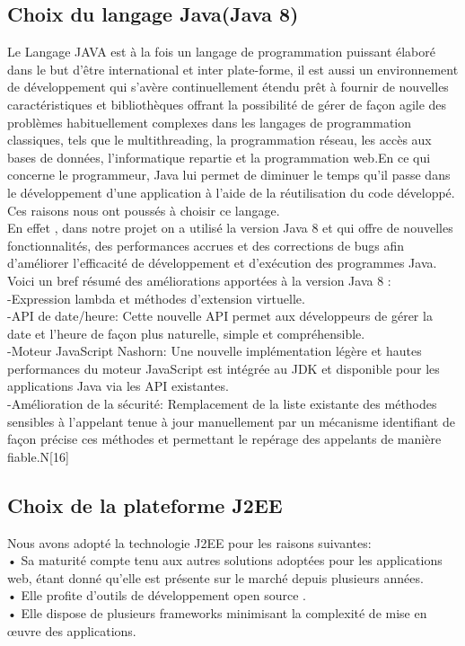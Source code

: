 \documentclass[a4paper,12pt,oneside]{report}
\begin{document}
\subsection{Choix du langage Java(Java 8)}
Le Langage JAVA est à la fois un langage de programmation puissant élaboré dans le but d'être international et inter plate-forme, il est aussi un environnement de développement qui s'avère continuellement étendu prêt à fournir de nouvelles caractéristiques et bibliothèques offrant la possibilité de gérer de façon agile des problèmes habituellement complexes dans les langages de programmation classiques, tels que le multithreading, la programmation réseau, les accès aux bases de données, l'informatique repartie et la programmation web.En ce qui concerne le programmeur, Java lui permet de diminuer le temps qu'il passe dans le développement d'une application  à l'aide de  la réutilisation du code développé. Ces raisons nous ont poussés à choisir ce langage. \\
En effet , dans notre projet on a utilisé la version Java 8 et qui offre de nouvelles fonctionnalités, des performances accrues et des corrections de bugs afin d'améliorer l'efficacité de développement et d'exécution des programmes Java.\\
Voici un bref résumé des améliorations apportées à la version Java 8 : \\
-Expression lambda et méthodes d'extension virtuelle.\\
-API de date/heure:
Cette nouvelle API permet aux développeurs de gérer la date et l'heure de façon plus naturelle, simple et compréhensible.\\
-Moteur JavaScript Nashorn:
Une nouvelle implémentation légère et hautes performances du moteur JavaScript est intégrée au JDK et disponible pour les applications Java via les API existantes.\\
-Amélioration de la sécurité:
Remplacement de la liste existante des méthodes sensibles à l'appelant tenue à jour manuellement par un mécanisme identifiant de façon précise ces méthodes et permettant le repérage des appelants de manière fiable.N[16]
\subsection{Choix de la plateforme J2EE}
Nous avons adopté la technologie J2EE pour les raisons suivantes: \\
• Sa maturité compte tenu aux autres solutions adoptées pour les applications web, étant donné qu'elle est présente sur le marché depuis plusieurs années. \\
• Elle profite d’outils de développement open source .\\
• Elle dispose de plusieurs frameworks minimisant la complexité de mise en œuvre des applications. 
\end{document}

